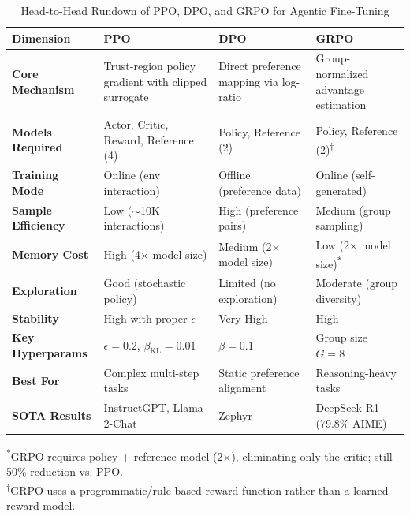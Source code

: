 \documentclass[12pt,a4paper]{report}
\theoremstyle{definition}
\begin{document}
\begin{table}[h]
\centering
\caption{Head-to-Head Rundown of PPO, DPO, and GRPO for Agentic Fine-Tuning}
\label{tab:algorithm_comparison}
\small
\begin{tabular}{@{}p{2.8cm}p{3.8cm}p{3.8cm}p{3.8cm}@{}}
\toprule
\textbf{Dimension} & \textbf{PPO} & \textbf{DPO} & \textbf{GRPO} \\
\midrule
\textbf{Core Mechanism} & Trust-region policy gradient with clipped surrogate & Direct preference mapping via log-ratio &
 Group-normalized advantage estimation \\
\addlinespace
\textbf{Models Required} & Actor, Critic, Reward, Reference (4) & Policy, Reference (2) & Policy, Reference (2)\textsuperscript{$\dagger$} \\
\addlinespace
\textbf{Training Mode} & Online (env interaction) & Offline (preference data) & Online (self-generated) \\
\addlinespace
\textbf{Sample Efficiency} & Low ($\sim$10K interactions) & High (preference pairs) & Medium (group sampling) \\
\addlinespace
\textbf{Memory Cost} & High (4$\times$ model size) & Medium (2$\times$ model size) & Low (2$\times$ model size)\textsuperscript{*} \\
\addlinespace
\textbf{Exploration} & Good (stochastic policy) & Limited (no exploration) & Moderate (group diversity) \\
\addlinespace
\textbf{Stability} & High with proper $\epsilon$ & Very High & High \\
\addlinespace
\textbf{Key Hyperparams} & $\epsilon=0.2$, $\beta_{\text{KL}}=0.01$ & $\beta=0.1$ & Group size $G=8$ \\
\addlinespace
\textbf{Best For} & Complex multi-step tasks & Static preference alignment & Reasoning-heavy tasks \\
\addlinespace
\textbf{SOTA Results} & InstructGPT, Llama-2-Chat & Zephyr & DeepSeek-R1 (79.8\% AIME) \\
\bottomrule
\end{tabular}

\vspace{0.2cm}
\small\textsuperscript{*}GRPO requires policy + reference model (2$\times$), eliminating only the critic; still 50\% reduction vs. PPO.\\
\textsuperscript{$\dagger$}GRPO uses a programmatic/rule-based reward function rather than a learned reward model.
\end{table}
\end{document}
